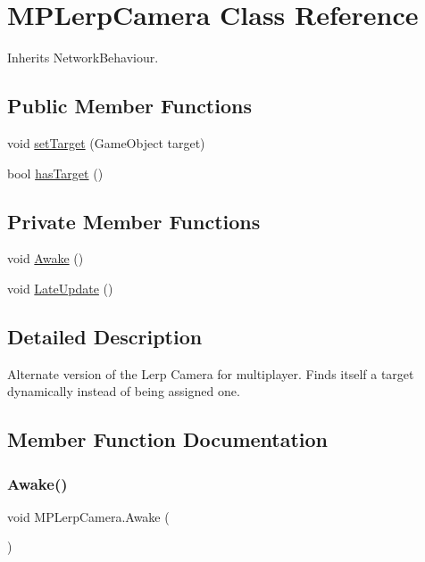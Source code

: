 \hypertarget{class_m_p_lerp_camera}{}\section{M\+P\+Lerp\+Camera Class Reference}
\label{class_m_p_lerp_camera}


Inherits Network\+Behaviour.

\subsection*{Public Member Functions}
\begin{DoxyCompactItemize}
\item 
void \hyperlink{class_m_p_lerp_camera_a1c75492c5d0813ea66cee2c3e98a6904}{set\+Target} (Game\+Object target)
\item 
bool \hyperlink{class_m_p_lerp_camera_a9f0745c8f677c1ad470dee1e06aee457}{has\+Target} ()
\end{DoxyCompactItemize}
\subsection*{Private Member Functions}
\begin{DoxyCompactItemize}
\item 
void \hyperlink{class_m_p_lerp_camera_af5c43c4eebc02520b2f9a6c1a7e75661}{Awake} ()
\item 
void \hyperlink{class_m_p_lerp_camera_a6e6a8bf08b3f9ca3b93aa47bd8339f3b}{Late\+Update} ()
\end{DoxyCompactItemize}


\subsection{Detailed Description}
Alternate version of the Lerp Camera for multiplayer. Finds itself a target dynamically instead of being assigned one. 



\subsection{Member Function Documentation}
\mbox{\label{class_m_p_lerp_camera_af5c43c4eebc02520b2f9a6c1a7e75661}} 
\subsubsection{\texorpdfstring{Awake()}{Awake()}}
{\footnotesize\ttfamily void M\+P\+Lerp\+Camera.\+Awake (\begin{DoxyParamCaption}{ }\end{DoxyParamCaption})\hspace{0.3cm}{\ttfamily [private]}}



